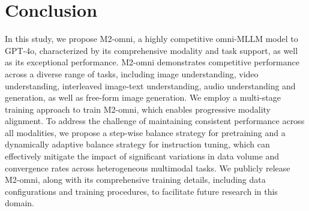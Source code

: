 \section{Conclusion}\label{sec:conclusion}

In this study, we propose M2-omni, a highly competitive omni-MLLM model to GPT-4o, characterized by its comprehensive modality and task support, as well as its exceptional performance. M2-omni demonstrates competitive performance across a diverse range of tasks, including image understanding, video understanding, interleaved image-text understanding, audio understanding and generation, as well as free-form image generation. We employ a multi-stage training approach to train M2-omni, which enables progressive modality alignment. To address the challenge of maintaining consistent performance across all modalities, we propose a step-wise balance strategy for pretraining and a dynamically adaptive balance strategy for instruction tuning, which can effectively mitigate the impact of significant variations in data volume and convergence rates across heterogeneous multimodal tasks. We publicly release M2-omni, along with its comprehensive training details, including data configurations and training procedures, to facilitate future research in this domain.
